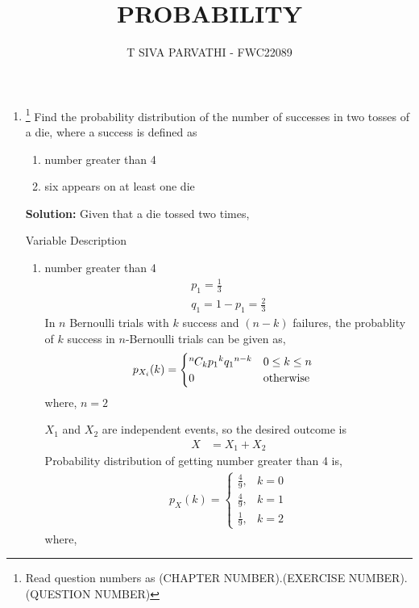 \documentclass{article}
\newcommand{\solution}{\noindent \textbf{Solution: }}
\newcommand*{\permcomb}[4][0mu]{{{}^{#3}\mkern#1#2_{#4}}}
\newcommand*{\comb}[1][-1mu]{\permcomb[#1]{C}}
\begin{document}
\title{PROBABILITY}
\author{\Large T SIVA PARVATHI - FWC22089}
\date{}

\maketitle
\begin{enumerate}[label=13.\arabic{enumi}.\arabic{enumii}]%
\setcounter{enumi}{3}
\setcounter{enumii}{5}

\item \footnote{Read question numbers as (CHAPTER NUMBER).(EXERCISE NUMBER).(QUESTION NUMBER)}
Find the probability distribution of the number of successes in two tosses of a die, where a success is defined as
\begin{enumerate}
\item number greater than 4
\item six appears on at least one die
\end{enumerate}

\solution
Given that a die tossed two times,
\begin{table}[h]\centering
	
	 \caption{Variable Description}\label{tab:}
\end{table}
\begin{enumerate}
\item number greater than 4
\begin{align}
p_1 = \frac{1}{3}\\           
q_1 = 1 - p_1 = \frac{2}{3}     
\end{align}
In $n$ Bernoulli trials with $k$ success and $(n - k)$ failures, the probablity of $k$ success in $n$-Bernoulli trials can be given as,
\begin{align}
p_{X_i}(k) &= 
\begin{cases}
\comb{n}{k}{p_1}^{k}{q_1}^{n-k} & 0 \le k \le n\\
0 & \text{otherwise}                
\end{cases}
\end{align}
where, $n = 2$

$X_1$ and $X_2$ are independent events, so the desired outcome is
\begin{align}
X&=X_1+X_2
\end{align}
Probability distribution of getting number greater than 4 is,
\begin{align}
  p_X(k) =
    \begin{cases}
      \frac{4}{9}, &  k = 0\\
      \frac{4}{9}, & k = 1\\
      \frac{1}{9}, & k = 2
    \end{cases}       
\end{align}
where, 


\end{enumerate}
\end{enumerate}
\end{document}
